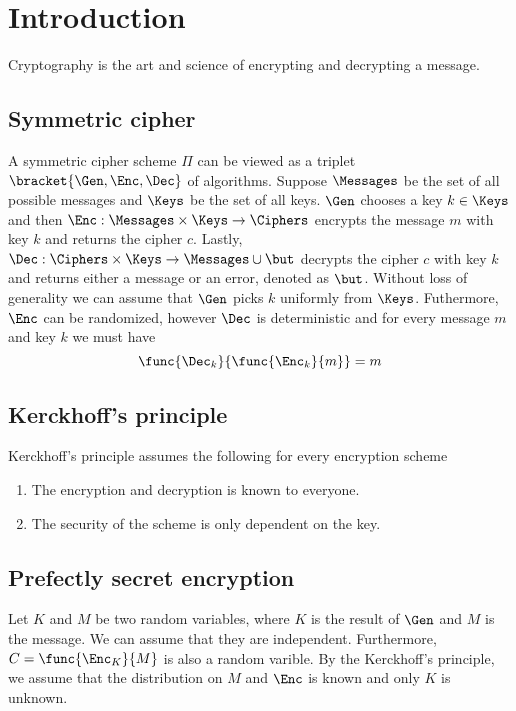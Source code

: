 \chapter{Introduction}
Cryptography is the art and science of encrypting and decrypting a message. 
\section{Symmetric cipher}
A symmetric cipher scheme \(\Pi\) can be viewed as a triplet \(\bracket{\Gen, \Enc , \Dec}\) of algorithms. Suppose \(\Messages\) be the set of all possible messages and \(\Keys\) be the set of all keys. \(\Gen\) chooses a key \(k \in \Keys\) and then \(\Enc : \Messages \times \Keys \to \Ciphers\) encrypts the message \(m\) with key \(k\) and returns the cipher \(c\). Lastly, \(\Dec: \Ciphers \times \Keys \to \Messages \cup \but\) decrypts the cipher \(c\) with key \(k\) and returns either a message or an error, denoted as \(\but\). Without loss of generality we can assume that \(\Gen\) picks \(k\) uniformly from \(\Keys\). Futhermore, \(\Enc\) can be randomized, however \(\Dec\) is deterministic and for every message \(m\) and key \(k\) we must have 
\begin{equation*}
    \func{\Dec_k}{\func{\Enc_k}{m}} = m
\end{equation*}

\section{Kerckhoff's principle}
Kerckhoff's principle assumes the following for every encryption scheme 
\begin{enumerate}
    \item The encryption and decryption is known to everyone.
    \item The security of the scheme is only dependent on the key.
\end{enumerate}

\section{Prefectly secret encryption}
Let \(K\) and \(M\) be two random variables, where \(K\) is the result of \(\Gen\) and \(M\) is the message. We can assume that they are independent. Furthermore, \( C = \func{\Enc_K}{M}\) is also a random varible. By the Kerckhoff's principle, we assume that the distribution on \(M\) and \(\Enc\) is known and only \(K\) is unknown. 


